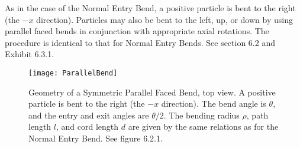         As in the case of the Normal Entry Bend, a positive particle is
bent to the right (the $-x$ direction).  Particles may also be bent to the
left, up, or down by using parallel faced bends in conjunction with
appropriate axial rotations.  The procedure is identical to that for Normal
Entry Bends.  See section 6.2 and Exhibit 6.3.1.


\begin{figure}[hp]
  \centering
  \texttt{[image: ParallelBend]}
  \caption{Geometry of a Symmetric Parallel Faced Bend, top view.  A
positive particle is bent to the right (the $-x$ direction).  The bend angle
is $\theta$, and the entry and exit angles are $\theta/2$.  The bending radius $\rho$, path length $l$, and cord length $d$ are given by the same relations as for the
Normal Entry Bend.  See figure 6.2.1.}
\end{figure}

\clearpage


